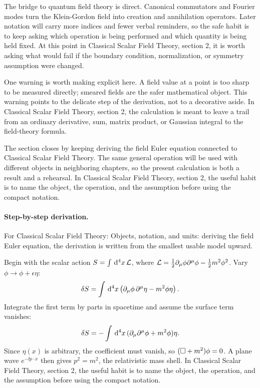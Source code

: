 The bridge to quantum field theory is direct.  Canonical commutators and Fourier modes turn the Klein-Gordon field into creation and annihilation operators.  Later notation will carry more indices and fewer verbal reminders, so the safe habit is to keep asking which operation is being performed and which quantity is being held fixed.  At this point in Classical Scalar Field Theory, section 2, it is worth asking what would fail if the boundary condition, normalization, or symmetry assumption were changed.

One warning is worth making explicit here.  A field value at a point is too sharp to be measured directly; smeared fields are the safer mathematical object.  This warning points to the delicate step of the derivation, not to a decorative aside.  In Classical Scalar Field Theory, section 2, the calculation is meant to leave a trail from an ordinary derivative, sum, matrix product, or Gaussian integral to the field-theory formula.

The section closes by keeping deriving the field Euler equation connected to Classical Scalar Field Theory.  The same general operation will be used with different objects in neighboring chapters, so the present calculation is both a result and a rehearsal.  In Classical Scalar Field Theory, section 2, the useful habit is to name the object, the operation, and the assumption before using the compact notation.



\paragraph{Step-by-step derivation.}

For Classical Scalar Field Theory: Objects, notation, and units: deriving the field Euler equation, the derivation is written from the smallest usable model upward.

Begin with the scalar action \(S=\int\,\mathrm d^4x\,\mathcal L\), where \(\mathcal L=\frac12\partial_\mu\phi\partial^\mu\phi-\frac12m^2\phi^2\).  Vary \(\phi\to\phi+\epsilon\eta\):
\[
  \delta S=\int\,\mathrm d^4x\left(\partial_\mu\phi\,\partial^\mu\eta-m^2\phi\eta\right).
\]
Integrate the first term by parts in spacetime and assume the surface term vanishes:
\[
  \delta S=-\int\,\mathrm d^4x\,(\partial_\mu\partial^\mu\phi+m^2\phi)\eta.
\]
Since \(\eta(x)\) is arbitrary, the coefficient must vanish, so \((\Box+m^2)\phi=0\).  A plane wave \(e^{-\ii p\cdot x}\) then gives \(p^2=m^2\), the relativistic mass shell.  In Classical Scalar Field Theory, section 2, the useful habit is to name the object, the operation, and the assumption before using the compact notation.

